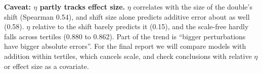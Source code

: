 \noindent\textbf{Caveat: $\eta$ partly tracks effect size.} $\eta$ correlates with the size
of the double's shift (Spearman 0.54), and shift size alone predicts additive error about as
well (0.58). $\eta$ relative to the shift barely predicts it (0.15), and the scale-free \pd
hardly falls across tertiles (0.880 to 0.862). Part of the trend is ``bigger perturbations
have bigger absolute errors''. For the final report we will compare models with addition
within tertiles, which cancels scale, and check conclusions with relative $\eta$ or effect
size as a covariate.
